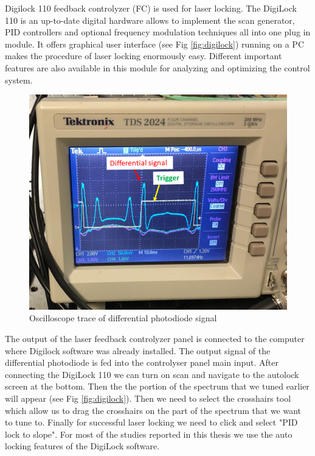 Digilock 110 feedback controlyzer (FC) is used for laser locking. The DigiLock 110 is an up-to-date digital hardware allows to implement the scan generator, PID controllers and optional frequency modulation techniques all into one plug in module. It offers graphical user interface (see Fig \ref{fig:digilock}) running on a PC makes the procedure of laser locking enormously easy. Different important features are also available in this module for analyzing and optimizing the control system.
 \begin{figure}[h]
\centering
\includegraphics[width=0.7\linewidth]{figures/laser tune.png}
\caption{Oscilloscope trace of differential photodiode signal \label{fig:laser tune}}
\end{figure}
The output of the laser feedback controlyzer panel is connected to the computer where Digilock software was already installed. The output signal of the differential photodiode is fed into the controlyser panel main input. After connecting the DigiLock 110 we can turn on scan and navigate to the autolock screen at the bottom. Then the the portion of the spectrum that we tuned earlier will appear (see Fig \ref{fig:digilock}). Then we need to select the crosshairs tool which allow us to drag the crosshairs on the part of the spectrum that we want to tune to. Finally for successful laser locking we need to click and select "PID lock to slope". For most of the studies reported in this thesis we use the auto locking features of the DigiLock software.


